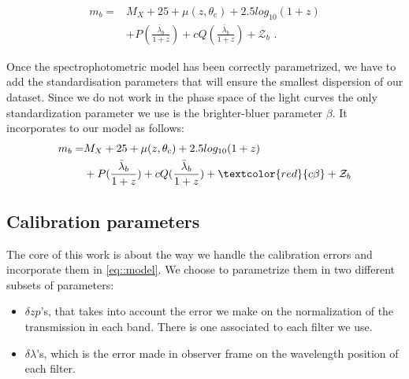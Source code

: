 \documentclass[\docopts]{\docclass}
\begin{document}
\begin{equation}
\begin{split}
m_b = &M_X + 25 + \mu(z, \theta_\text{c}) + 2.5log_{10}(1+z) \\
&+ P(\frac{\bar\lambda_b }{1+z}) + cQ(\frac{\bar\lambda_b }{1+z})+ \mathcal{Z}_b \text{ .}
\end{split}
\end{equation}

Once the spectrophotometric model has been correctly parametrized, we have to add the standardisation parameters that will ensure the smallest dispersion of our dataset.
Since we do not work in the phase space of the light curves the only standardization parameter we use is the brighter-bluer parameter $\beta$.
It incorporates to our model as follows:
\begin{equation}
\begin{split}
\label{eq::model}
m_b = &M_X + 25 + \mu(z, \theta_\text{c}) + 2.5log_{10}(1+z) \\
&+ P(\frac{\bar\lambda_b }{1+z}) + cQ(\frac{\bar\lambda_b }{1+z}) + \textcolor{red}{c\beta}+ \mathcal{Z}_b
\end{split}
\end{equation}


\subsection{Calibration parameters}
\label{sec::calib_uncertainties}
The core of this work is about the way we handle the calibration errors and incorporate them in \ref{eq::model}.
We choose to parametrize them in two different subsets of parameters:
\begin{itemize}
\item $\delta zp$'s, that takes into account the error we make on the normalization of the transmission in each band.
There is one associated to each filter we use.
\item $\delta \lambda$'s, which is the error made in observer frame on the wavelength position of each filter. 
\end{itemize}
\end{document}
